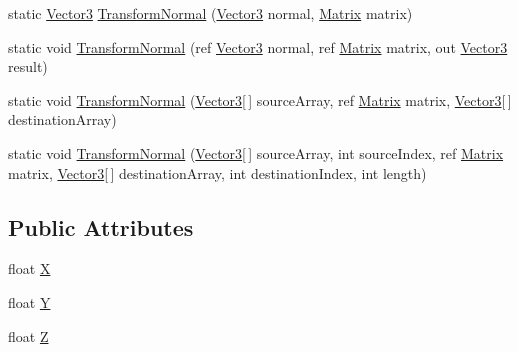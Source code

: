 \begin{DoxyCompactItemize}
\item 
static \hyperlink{structMicrosoft_1_1Xna_1_1Framework_1_1Vector3}{Vector3} \hyperlink{structMicrosoft_1_1Xna_1_1Framework_1_1Vector3_aaa94f2278df45d5bf2b3e34325089639}{Transform\+Normal} (\hyperlink{structMicrosoft_1_1Xna_1_1Framework_1_1Vector3}{Vector3} normal, \hyperlink{structMicrosoft_1_1Xna_1_1Framework_1_1Matrix}{Matrix} matrix)
\item 
static void \hyperlink{structMicrosoft_1_1Xna_1_1Framework_1_1Vector3_a4e1118d3bbae558c5ba9baa069550cb7}{Transform\+Normal} (ref \hyperlink{structMicrosoft_1_1Xna_1_1Framework_1_1Vector3}{Vector3} normal, ref \hyperlink{structMicrosoft_1_1Xna_1_1Framework_1_1Matrix}{Matrix} matrix, out \hyperlink{structMicrosoft_1_1Xna_1_1Framework_1_1Vector3}{Vector3} result)
\item 
static void \hyperlink{structMicrosoft_1_1Xna_1_1Framework_1_1Vector3_a106bebbc8ae2e24bbb524cc464c2ab1e}{Transform\+Normal} (\hyperlink{structMicrosoft_1_1Xna_1_1Framework_1_1Vector3}{Vector3}\mbox{[}$\,$\mbox{]} source\+Array, ref \hyperlink{structMicrosoft_1_1Xna_1_1Framework_1_1Matrix}{Matrix} matrix, \hyperlink{structMicrosoft_1_1Xna_1_1Framework_1_1Vector3}{Vector3}\mbox{[}$\,$\mbox{]} destination\+Array)
\item 
static void \hyperlink{structMicrosoft_1_1Xna_1_1Framework_1_1Vector3_af063eb04cfcf59f0d41315ef3f6d96f3}{Transform\+Normal} (\hyperlink{structMicrosoft_1_1Xna_1_1Framework_1_1Vector3}{Vector3}\mbox{[}$\,$\mbox{]} source\+Array, int source\+Index, ref \hyperlink{structMicrosoft_1_1Xna_1_1Framework_1_1Matrix}{Matrix} matrix, \hyperlink{structMicrosoft_1_1Xna_1_1Framework_1_1Vector3}{Vector3}\mbox{[}$\,$\mbox{]} destination\+Array, int destination\+Index, int length)
\end{DoxyCompactItemize}
\subsection*{Public Attributes}
\begin{DoxyCompactItemize}
\item 
float \hyperlink{structMicrosoft_1_1Xna_1_1Framework_1_1Vector3_ab3c4b737dfc5c78a6aba50dda616f7c3}{X}
\item 
float \hyperlink{structMicrosoft_1_1Xna_1_1Framework_1_1Vector3_ac915220fb659eb2c5958a1ccd81b80d4}{Y}
\item 
float \hyperlink{structMicrosoft_1_1Xna_1_1Framework_1_1Vector3_aa65967cca170d24dcd0d555df0d5ee4f}{Z}
\end{DoxyCompactItemize}
